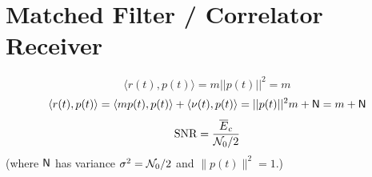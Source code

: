 \section*{Matched Filter / Correlator Receiver}

\begin{equation}
\langle r(t),p(t) \rangle = m || p(t) ||^2 = m
\label{eq:mfParcelOfInterest}
\end{equation}
\begin{equation}
\langle r(t),p(t)\rangle  = \langle m p(t),p(t)\rangle  + \langle \nu(t),p(t) \rangle  = || p(t) ||^2 m + {\mathsf N} = m + {\mathsf N}
\label{eq:mfNoisySignal}
\end{equation}
\begin{equation}
{\textrm{SNR}} = \frac{\overline E_c}{{\cal N}_0/2}
\end{equation}
(where ${\mathsf N}$ has variance $\sigma^2 = {\cal N}_0/2$ and $\|p(t)\|^2 = 1$.)

